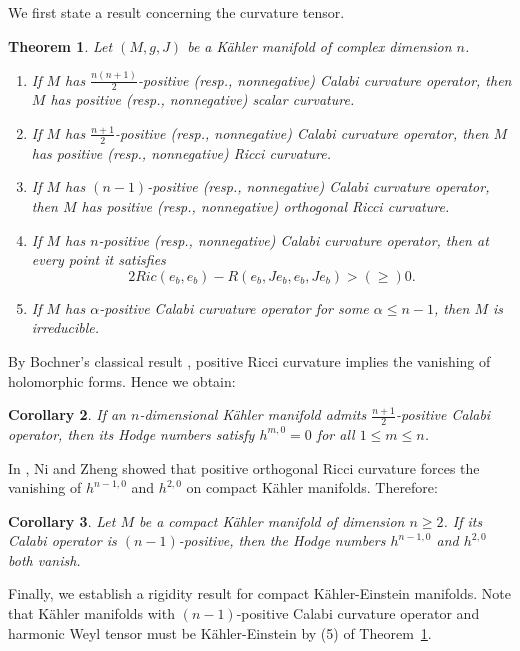 \documentclass{amsart}
\newtheorem{theorem}{Theorem}[section]
\newtheorem{corollary}[theorem]{Corollary}
\theoremstyle{definition}
\theoremstyle{remark}
\numberwithin{equation}{section}
\begin{document}
We first state a result concerning the curvature tensor.
\begin{theorem}
\label{theorem1.1}
Let $\left( {M,g,J} \right)$ be a K{\"a}hler manifold of complex dimension $n$.
\begin{enumerate}
\item If $M$ has $\frac{{n\left(n + 1\right)}}{2}$-positive (resp., nonnegative) Calabi curvature operator, then $M$ has positive (resp., nonnegative) scalar curvature.
\item If $M$ has $\frac{{n + 1}}{2}$-positive (resp., nonnegative) Calabi curvature operator, then $M$ has positive (resp., nonnegative) Ricci curvature.
\item If $M$ has $\left(n-1\right)$-positive (resp., nonnegative) Calabi curvature operator, then $M$ has positive (resp., nonnegative) orthogonal Ricci curvature.
\item If $M$ has $n$-positive (resp., nonnegative) Calabi curvature operator, then at every point it satisfies
$$2{Ric\left( {{e_b},{e_b}} \right) - R\left( {{e_b},J{e_b},{e_b},J{e_b}} \right)}> \left( \ge \right) 0.$$

\item If $M$ has $\alpha $-positive Calabi curvature operator for some $\alpha  \le n-1$, then $M$ is irreducible.
\end{enumerate}
\end{theorem}
By Bochner's classical result \cite{bochner1946vector}, positive Ricci curvature implies the vanishing of holomorphic forms. Hence we obtain:
\begin{corollary}
\label{corollary1.2}
 If an $n$-dimensional K{\"a}hler manifold admits $\frac{{n + 1}}{2}$-positive Calabi operator, then its Hodge numbers satisfy ${h^{m,0}}=0$ for all $1 \le m \le n$.
\end{corollary}
In \cite{ni2018comparison}, Ni and Zheng showed that positive orthogonal Ricci curvature forces the vanishing of ${h^{n - 1,0}}$ and ${h^{2,0}}$ on compact K{\"a}hler manifolds. Therefore:
\begin{corollary}
\label{corollary1.3}
Let $M$ be a compact K{\"a}hler manifold of dimension $n\geq2$. If its Calabi operator is $\left(n-1\right)$-positive, then the Hodge numbers ${h^{n - 1,0}}$ and ${h^{2,0}}$ both vanish.
\end{corollary}
Finally, we establish a rigidity result for compact K{\"a}hler-Einstein manifolds. Note that K{\"a}hler manifolds with $(n-1)$-positive Calabi curvature operator and harmonic Weyl tensor must be K{\"a}hler-Einstein by (5) of Theorem~\ref{theorem1.1}.
\end{document}
